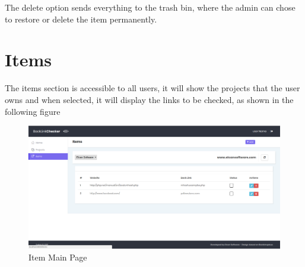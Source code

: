 The delete option sends everything to the trash bin, where the admin can chose to restore or delete the item permanently.

\section{Items}

The items section is accessible to all users, it will show the projects that the user owns and when selected, it will display the links to be checked, as shown in the following figure
\begin{figure}[H]
	\caption{Item Main Page}
	\label{img:confirm}
	\includegraphics[width=\textwidth]{images/items_main.png}
\end{figure}
